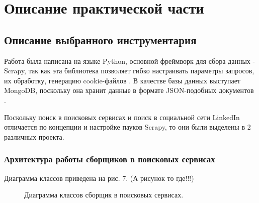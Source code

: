 \section{Описание практической части}
\label{sec:Chapter4} 
\subsection{Описание выбранного инструментария}
Работа была написана на языке Python, основной фреймворк для сбора данных - Scrapy, так как эта библиотека позволяет
гибко настраивать параметры запросов, их обработку, генерацию cookie-файлов \cite{scrapyBook}. В качестве базы данных
выступает MongoDB, поскольку она хранит данные в формате JSON-подобных документов \cite{mongoDBBook}. 

\par
Поскольку поиск в поисковых сервисах и поиск в социальной сети LinkedIn отличается по концепции и настройке пауков Scrapy, то
они были выделены в 2 различных проекта.

\subsubsection{Архитектура работы сборщиков в поисковых сервисах}
\par
Диаграмма классов приведена на рис. 7. (А рисунок то где!!!)

\begin{figure}[H]
    \caption{Диаграмма классов сборщик в поисковых сервисах.}
    \label{ris:image}
\end{figure}

